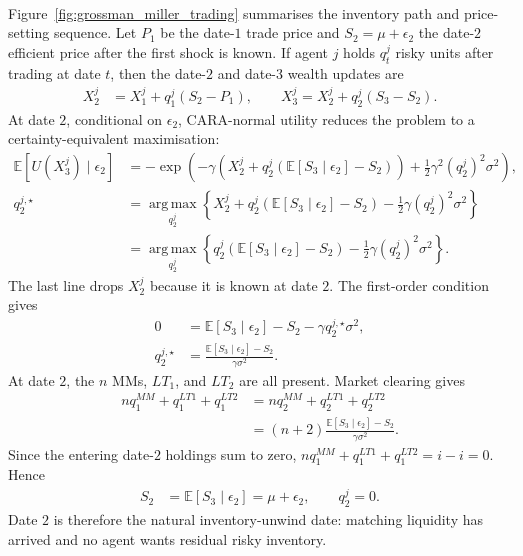 \begin{model}
\par\smallskip\noindent{}\\
Figure~\ref{fig:grossman_miller_trading} summarises the inventory path and price-setting sequence. Let $P_1$ be the date-$1$ trade price and $S_2=\mu+\epsilon_2$ the date-$2$ efficient price after the first shock is known. If agent $j$ holds $q_t^j$ risky units after trading at date $t$, then the date-$2$ and date-$3$ wealth updates are
\begin{align*}
X_2^j&=X_1^j+q_1^j(S_2-P_1), \qquad X_3^j=X_2^j+q_2^j(S_3-S_2).
\end{align*}
At date $2$, conditional on $\epsilon_2$, CARA-normal utility reduces the problem to a certainty-equivalent maximisation:
\begin{align*}
\mathbb{E}\left[U(X_3^j)\mid\epsilon_2\right]
&=-\exp\left(-\gamma\left(X_2^j+q_2^j(\mathbb{E}[S_3\mid\epsilon_2]-S_2)\right)+\frac{1}{2}\gamma^2(q_2^j)^2\sigma^2\right),\\
q_2^{j,\star}
&=\operatorname*{arg\,max}_{q_2^j}\left\{X_2^j+q_2^j(\mathbb{E}[S_3\mid\epsilon_2]-S_2)-\frac{1}{2}\gamma(q_2^j)^2\sigma^2\right\}\\
&=\operatorname*{arg\,max}_{q_2^j}\left\{q_2^j(\mathbb{E}[S_3\mid\epsilon_2]-S_2)-\frac{1}{2}\gamma(q_2^j)^2\sigma^2\right\}.
\end{align*}
The last line drops $X_2^j$ because it is known at date $2$. The first-order condition gives
\begin{align*}
0&=\mathbb{E}[S_3\mid\epsilon_2]-S_2-\gamma q_2^{j,\star}\sigma^2,\\
q_2^{j,\star}&=\frac{\mathbb{E}[S_3\mid\epsilon_2]-S_2}{\gamma\sigma^2}.
\end{align*}
At date $2$, the $n$ MMs, $LT_1$, and $LT_2$ are all present. Market clearing gives
\begin{align*}
nq_1^{MM}+q_1^{LT1}+q_1^{LT2}
&=nq_2^{MM}+q_2^{LT1}+q_2^{LT2}\\
&=(n+2)\frac{\mathbb{E}[S_3\mid\epsilon_2]-S_2}{\gamma\sigma^2}.
\end{align*}
Since the entering date-$2$ holdings sum to zero, $nq_1^{MM}+q_1^{LT1}+q_1^{LT2}=i-i=0$. Hence
\begin{align*}
S_2&=\mathbb{E}[S_3\mid\epsilon_2]=\mu+\epsilon_2, \qquad q_2^j=0.
\end{align*}
Date $2$ is therefore the natural inventory-unwind date: matching liquidity has arrived and no agent wants residual risky inventory.


\end{model}
